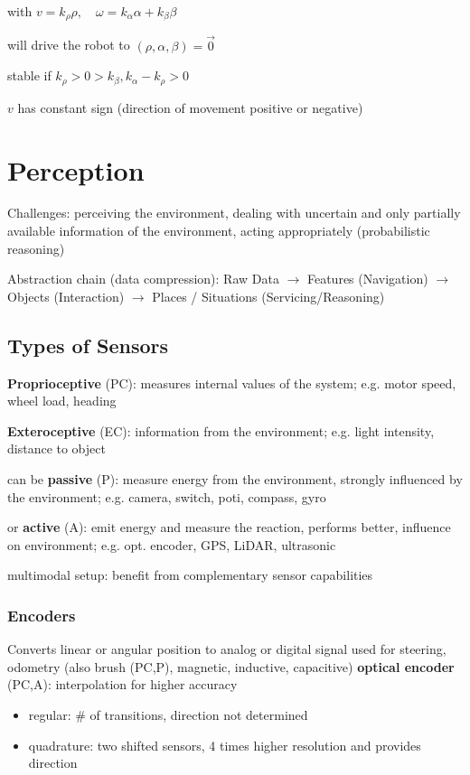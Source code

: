 \documentclass[fontsize=6pt]{scrartcl}
\begin{document}
\begin{multicols*}{4}
\begin{minipage}{0.5\columnwidth}
with $v=k_\rho \rho, \quad \omega = k_\alpha \alpha + k_\beta \beta$

will drive the robot to $(\rho, \alpha, \beta) = \vec 0$

stable if $k_\rho > 0 > k_\beta, k_\alpha - k_\rho > 0$
\end{minipage}
$v$ has constant sign (direction of movement positive or negative)

\section*{Perception}

Challenges: perceiving the environment, dealing with uncertain and only partially available information of the environment, acting appropriately (probabilistic reasoning)

Abstraction chain (data compression): 
Raw Data $\rightarrow$ Features (Navigation) $\rightarrow$ Objects (Interaction) $\rightarrow$ Places / Situations (Servicing/Reasoning)

\subsection*{Types of Sensors}
\textbf{Proprioceptive} (PC): measures internal values of the system; e.g. motor speed, wheel load, heading 

\textbf{Exteroceptive} (EC): information from the environment; e.g. light intensity, distance to object

can be \textbf{passive} (P): measure energy from the environment, strongly influenced by the environment; e.g. camera, switch, poti, compass, gyro

or \textbf{active} (A): emit energy and measure the reaction, performs better, influence on environment; e.g. opt. encoder, GPS, LiDAR, ultrasonic

multimodal setup: benefit from complementary sensor capabilities

\subsubsection*{Encoders}
Converts linear or angular position to analog or digital signal used for steering, odometry (also brush (PC,P), magnetic, inductive, capacitive)
\textbf{optical encoder} (PC,A): interpolation for higher accuracy
\begin{itemize}
	\item regular: \# of transitions, direction not determined
	\item quadrature: two shifted sensors, 4 times higher resolution and provides direction
\end{itemize}


\end{multicols*}
\end{document}
